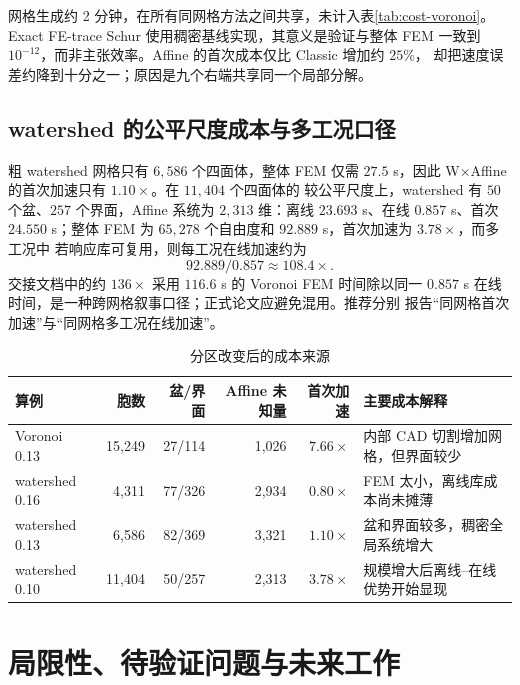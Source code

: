 \documentclass[UTF8,zihao=-4]{ctexart}
\begin{document}
网格生成约 2 分钟，在所有同网格方法之间共享，未计入表\ref{tab:cost-voronoi}。
Exact FE-trace Schur 使用稠密基线实现，其意义是验证与整体 FEM 一致到
$10^{-12}$，而非主张效率。Affine 的首次成本仅比 Classic 增加约 $25\%$，
却把速度误差约降到十分之一；原因是九个右端共享同一个局部分解。

\subsection{watershed 的公平尺度成本与多工况口径}

粗 watershed 网格只有 $6{,}586$ 个四面体，整体 FEM 仅需 $27.5$ s，因此
W$\times$Affine 的首次加速只有 $1.10\times$。在 $11{,}404$ 个四面体的
较公平尺度上，watershed 有 $50$ 个盆、$257$ 个界面，Affine 系统为
$2{,}313$ 维：离线 $23.693$ s、在线 $0.857$ s、首次 $24.550$ s；整体 FEM
为 $65{,}278$ 个自由度和 $92.889$ s，首次加速为 $3.78\times$，而多工况中
若响应库可复用，则每工况在线加速约为
\begin{equation}
  92.889/0.857\approx108.4\times.
\end{equation}
交接文档中的约 $136\times$ 采用 $116.6$ s 的 Voronoi FEM 时间除以同一
$0.857$ s 在线时间，是一种跨网格叙事口径；正式论文应避免混用。推荐分别
报告``同网格首次加速''与``同网格多工况在线加速''。

\begin{table}[htbp]
\centering
\caption{分区改变后的成本来源}
\label{tab:cost-partition}
\small
\begin{tabularx}{\textwidth}{lrrrrX}
\toprule
算例 & 胞数 & 盆/界面 & Affine 未知量 & 首次加速 & 主要成本解释\\
\midrule
Voronoi 0.13 & 15,249 & 27/114 & 1,026 & $7.66\times$
& 内部 CAD 切割增加网格，但界面较少\\
watershed 0.16 & 4,311 & 77/326 & 2,934 & $0.80\times$
& FEM 太小，离线库成本尚未摊薄\\
watershed 0.13 & 6,586 & 82/369 & 3,321 & $1.10\times$
& 盆和界面较多，稠密全局系统增大\\
watershed 0.10 & 11,404 & 50/257 & 2,313 & $3.78\times$
& 规模增大后离线--在线优势开始显现\\
\bottomrule
\end{tabularx}
\end{table}

\section{局限性、待验证问题与未来工作}
\end{document}
